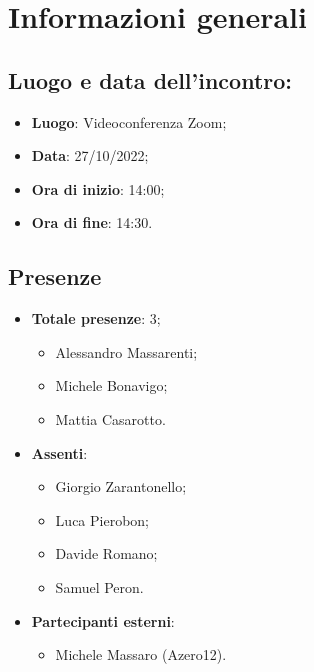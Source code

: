 \section{Informazioni generali}

    \subsection{Luogo e data dell'incontro:}
    \begin{itemize}
        \item \textbf{Luogo}: Videoconferenza Zoom;
        \item \textbf{Data}: 27/10/2022;
        \item \textbf{Ora di inizio}: 14:00;
        \item \textbf{Ora di fine}: 14:30.
    \end{itemize}
    \subsection{Presenze}
    \begin{itemize}
        \item \textbf{Totale presenze}: 3;
        \begin{itemize}
            \item Alessandro Massarenti;
            \item Michele Bonavigo;
            \item Mattia Casarotto.
        \end{itemize}
        \item \textbf{Assenti}:
        \begin{itemize}
            \item Giorgio Zarantonello;
            \item Luca Pierobon;
            \item Davide Romano;
            \item Samuel Peron.
        \end{itemize}
        \item \textbf{Partecipanti esterni}:
        \begin{itemize}
            \item Michele Massaro (Azero12).
        \end{itemize}
    \end{itemize}